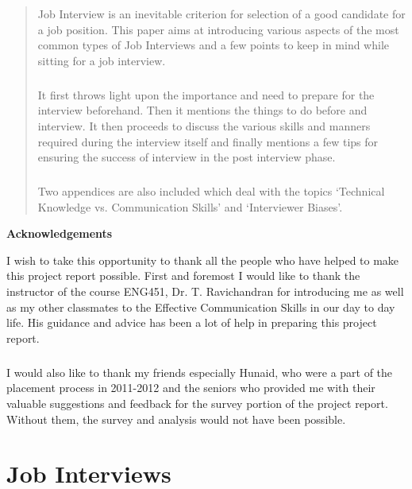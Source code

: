 \documentclass[a4paper,12pt]{report}
\makeatletter
\newcommand\ackname{Acknowledgements}
\newenvironment{acknowledgements}{%
      \titlepage
      \null\vfil
      \@beginparpenalty\@lowpenalty
      \begin{center}%
        \bfseries \ackname
        \@endparpenalty\@M
      \end{center}}%
     {\par\vfil\null\endtitlepage}
\newenvironment{acknowledgements}{%
      \if@twocolumn
        \section*{\abstractname}%
      \else
        \small
        \begin{center}%
          {\bfseries \ackname\vspace{-.5em}\vspace{\z@}}%
        \end{center}%
        \quotation
      \fi}
      {\if@twocolumn\else\endquotation\fi}
\makeatother
\begin{document}


\begin{abstract}
Job Interview is an inevitable criterion for selection of a good candidate for a job position. This paper aims at introducing various aspects
of the most common types of Job Interviews and a few points to keep in mind while sitting for a job interview.
\paragraph{}
It first throws light upon the importance and need to prepare for the interview beforehand. Then it mentions the
things to do before and interview. It then proceeds to discuss the various skills and manners required during the interview itself 
and finally mentions a few tips for ensuring the success of interview in the post interview phase.
\paragraph{}
Two appendices are also included which deal with the topics `Technical Knowledge vs. Communication Skills'
and `Interviewer Biases'.
\end{abstract}

\begin{acknowledgements}
I wish to take this opportunity to thank all the people who have helped to make this project report possible.
 First and foremost I would like to thank the instructor of the course ENG451, Dr. T. Ravichandran
for introducing me as well as my other classmates to the Effective Communication Skills
 in our day to day life. His guidance and advice has been a lot of help in preparing this project report.
\paragraph{}
I would also like to thank my friends especially Hunaid, who were a part of the placement process in
2011-2012 and the seniors who provided me with their valuable suggestions and feedback for
the survey portion of the project report. Without them, the survey and analysis would not have been possible.
\end{acknowledgements}

\tableofcontents

\chapter{Job Interviews}             %
\end{document}
